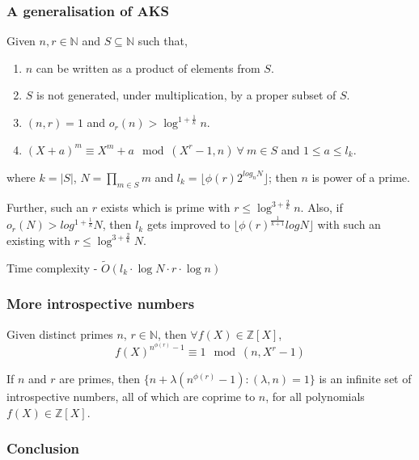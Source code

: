 \documentclass{beamer}
\begin{document}
\begin{frame}
\frametitle{A generalisation of AKS}
\begin{theorem}
\label{theorem:GeneralizedAKS}
Given $n, r \in \mathbb{N}$ and $S \subseteq \mathbb{N}$ such that,
\begin{enumerate}[1.]
\item $n$ can be written as a product of elements from $S$.
\item $S$ is not generated, under multiplication, by a proper subset of $S$.
\item $(n, r) = 1$ and $o_r(n) > \log^{1 + \frac 1 {k}} n$.
\item $(X+a)^m \equiv X^m + a \mod (X^r-1, n)\ \forall \ m \in S$ and $1 \leq a \leq l_k$.
\end{enumerate}
where $k = |S|$, $\displaystyle N = \prod_{m \in S} m$ and $l_k = \lfloor \phi(r)2^{log_n N}\rfloor$; then $n$ is power of a prime. 

Further, such an $r$ exists which is prime with $r \leq \log^{3 + \frac{2}{k}} n$. Also, if $o_r(N) > log^{1 + \frac{1}{k}} N$, then $l_k$ gets improved to $\lfloor \phi(r)^\frac{1}{k+1} log N \rfloor$ with such an existing with $r \leq \log^{3 + \frac{2}{k}} N$.
\end{theorem}
Time complexity - $\tilde O(l_k \cdot \log N \cdot r \cdot \log n)$
\end{frame}

\begin{frame}
\frametitle{More introspective numbers}
\begin{lemma}
\label{lemma:MoreIntrospectiveNumbers}
Given distinct primes $n$, $r \in \mathbb{N}$, then $\forall f(X) \in \mathbb{Z}[X]$,
\[f(X)^{n^{\phi(r)}-1} \equiv 1 \mod (n, X^r - 1)\]
\end{lemma}

\begin{corollary}
\label{corollary:MoreIntrospectiveNumbersCorollary}
If $n$ and $r$ are primes, then $\{n + \lambda (n^{\phi(r)} - 1): (\lambda, n) = 1 \}$ is an infinite set of introspective numbers, all of which are coprime to $n$, for all polynomials $f(X) \in \mathbb{Z}[X]$.
\end{corollary}
\end{frame}

\begin{frame}
\frametitle{Conclusion}
\end{frame}
\end{document}
